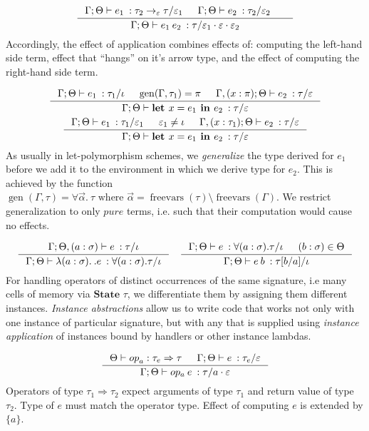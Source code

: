 \documentclass[declaration,shortabstract]{iithesis}
\theoremstyle{definition} \newtheorem{definition}{Definition}[section]
\newcommand{\types}[4][\Gamma;\Theta]{\ensuremath{{{#1} \vdash {#2} \: : {#3}/{#4}}}}
\newcommand{\arrow}[3]{{#1}\rightarrow_{#2}{#3}}
\newcommand{\lam}[1][x]{\ensuremath{\lambda #1.\:}}
\newcommand{\optypes}[5][\Theta]{\ensuremath{{#1}\vdash{#2}_{#3} : {#4} \Rightarrow {#5}}}
\newcommand{\ops}[2]{\optypes{op}{a}{#1}{#2}}
\begin{document}
$$
\inference{
    \types{e_1}{\arrow{\tau_2}{\varepsilon}{\tau}}{\varepsilon_1} &
    \types{e_2}{\tau_2}{\varepsilon_2} &
}{
    \types{e_1\:e_2}{\tau}{\varepsilon_1 \cdot \varepsilon \cdot \varepsilon_2}
}
$$
Accordingly, the effect of application combines effects of: computing the left-hand side term,
effect that ``hangs'' on it's arrow type, and the effect of computing the right-hand side term.

\begin{gather*}
\begin{gathered}
\inference{
    \types{e_1}{\tau_1}{\iota} &
    \operatorname{gen}(\Gamma, \tau_1) = \pi &
    \types[\Gamma,(x:\pi);\Theta]{e_2}{\tau}{\varepsilon}
}{
    \types{\textbf{let } x = e_1 \textbf{ in } e_2}{\tau}{\varepsilon}
}
\\
\inference{
    \types{e_1}{\tau_1}{\varepsilon_1} & 
    \varepsilon_1 \neq \iota & 
    \types[\Gamma,(x:\tau_1);\Theta]{e_2}{\tau}{\varepsilon}
}{
    \types{\textbf{let } x = e_1 \textbf{ in } e_2}{\tau}{\varepsilon}
}
\end{gathered}
\end{gather*}
As usually in let-polymorphism schemes, we \textit{generalize} the type derived for $e_1$ before
we add it to the environment in which we derive type for $e_2$.
This is achieved by the function
$\operatorname{gen}(\Gamma, \tau) = \forall \vec\alpha.\:\tau \text{ where }
\vec\alpha = \operatorname{freevars}(\tau) \setminus \operatorname{freevars}(\Gamma)$.
We restrict generalization to only $pure$ terms,
i.e. such that their computation would cause no effects.

$$
\inference{
    \types[\Gamma; \Theta, (a : \sigma)]{e}{\tau}{\iota}
}{
    \types{\lam[(a : \sigma)]. e}{\forall (a : \sigma) . \tau}{\iota}
}
\quad
\inference{
    \types{e}{\forall (a : \sigma) . \tau}{\iota} & (b:\sigma) \in \Theta
}{
    \types{e\:b}{\tau[b/a]}{\iota}
}
$$
For handling operators of distinct occurrences of the same signature,
i.e many cells of memory via $\textbf{State }\tau$,
we differentiate them by assigning them different instances.
\textit{Instance abstractions} allow us to write code that works not only with one instance of particular signature,
but with any that is supplied using \textit{instance application} of instances bound by handlers or other instance lambdas.

$$
\inference{
    \ops{\tau_e}{\tau} &
    \types{e}{\tau_e}{\varepsilon} 
}{
    \types{op_a \: e}{\tau}{a \cdot \varepsilon}
}
$$
Operators of type $\tau_1 \Rightarrow \tau_2$ expect arguments of type $\tau_1$
and return value of type $\tau_2$. Type of $e$ must match the operator type.
Effect of computing $e$ is extended by $\{a\}$.
\end{document}
